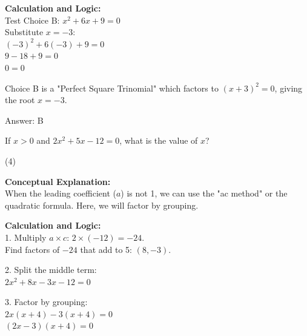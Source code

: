 \documentclass[11pt,paper=a4,answers]{exam}
\begin{document}
\begin{questions}
\begin{solution}
\vspace{15pt}

\textbf{Calculation and Logic:} \\
Test Choice B: $x^2 + 6x + 9 = 0$ \\
Substitute $x = -3$: \\
$(-3)^2 + 6(-3) + 9 = 0$ \\
$9 - 18 + 9 = 0$ \\
$0 = 0$

\vspace{10pt}

Choice B is a "Perfect Square Trinomial" which factors to $(x+3)^2 = 0$, giving the root $x = -3$.

\vspace{20pt}

Answer: \colorbox{yellow!100}{B}
\end{solution}

\vspace{30pt}

\question
If $x > 0$ and $2x^2 + 5x - 12 = 0$, what is the value of $x$?
\begin{tasks}(4)
\end{tasks}

\begin{solution}
\textbf{Conceptual Explanation:} \\
When the leading coefficient ($a$) is not 1, we can use the "ac method" or the quadratic formula. Here, we will factor by grouping.

\vspace{15pt}

\textbf{Calculation and Logic:} \\
1. Multiply $a \times c$: $2 \times (-12) = -24$. \\
   Find factors of $-24$ that add to 5: $(8, -3)$.

\vspace{10pt}

2. Split the middle term: \\
   $2x^2 + 8x - 3x - 12 = 0$

\vspace{10pt}

3. Factor by grouping: \\
   $2x(x + 4) - 3(x + 4) = 0$ \\
   $(2x - 3)(x + 4) = 0$

\vspace{10pt}


\end{solution}
\end{questions}
\end{document}
